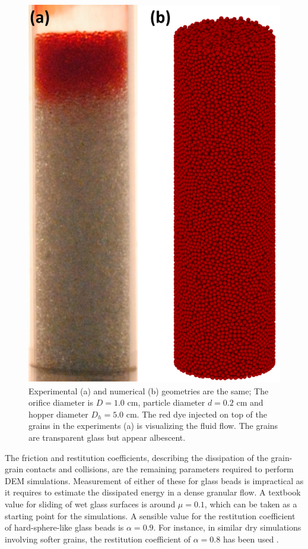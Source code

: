 \documentclass[twoside,twocolumn,9pt]{article}
\begin{document}
\begin{figure}
\includegraphics[width=\columnwidth]{fig2-snapshot_exp_sim.png}
\caption{Experimental (a) and numerical (b) geometries are the same; The orifice diameter is $D=1.0$ cm, particle diameter $d=0.2$ cm and hopper diameter $D_h=5.0$ cm. The red dye injected on top of the grains in the experiments (a) is visualizing the fluid flow. The grains are transparent glass but appear albescent.
\label{fig:Geometry}}
\end{figure}


The friction and restitution coefficients, describing the dissipation of the grain-grain contacts and collisions, are the 
remaining parameters required to perform DEM simulations. Measurement of either of these for glass beads is impractical as it requires to estimate the dissipated energy in a dense granular flow. A textbook value for sliding of wet glass surfaces is around $\mu=0.1$, which can be taken as a starting point for the simulations. 
A sensible value for the restitution coefficient of hard-sphere-like glass beads is $\alpha=0.9$. For instance, in similar dry simulations involving softer grains, the restitution coefficient of $\alpha=0.8$ has been used \cite{SchwartzGM12}. 
\end{document}
